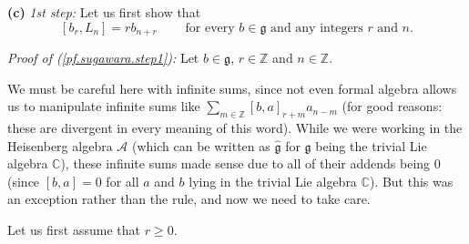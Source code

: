 \documentclass[etingof-lie.tex]{subfiles}
\begin{document}
\textbf{(c)} \textit{1st step:} Let us first show that%
\begin{equation}
\left[  b_{r},L_{n}\right]  =rb_{n+r}\ \ \ \ \ \ \ \ \ \ \text{for every }%
b\in\mathfrak{g}\text{ and any integers }r\text{ and }n.
\label{pf.sugawara.step1}%
\end{equation}


\textit{Proof of (\ref{pf.sugawara.step1}):} Let $b\in\mathfrak{g}$,
$r\in\mathbb{Z}$ and $n\in\mathbb{Z}$.

We must be careful here with infinite sums, since not even formal algebra
allows us to manipulate infinite sums like $\sum\limits_{m\in\mathbb{Z}%
}\left[  b,a\right]  _{r+m}a_{n-m}$ (for good reasons: these are divergent in
every meaning of this word). While we were working in the Heisenberg algebra
$\mathcal{A}$ (which can be written as $\widehat{\mathfrak{g}}$ for
$\mathfrak{g}$ being the trivial Lie algebra $\mathbb{C}$), these infinite
sums made sense due to all of their addends being $0$ (since $\left[
b,a\right]  =0$ for all $a$ and $b$ lying in the trivial Lie algebra
$\mathbb{C}$). But this was an exception rather than the rule, and now we need
to take care.

Let us first assume that $r\geq0$.
\end{document}
